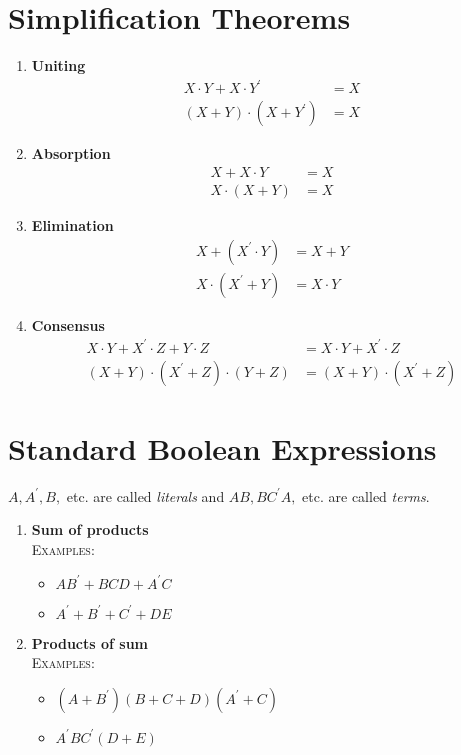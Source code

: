 \documentclass[oneside]{book}
\begin{document}
\section{Simplification Theorems}
\begin{enumerate}
	\item \textbf{Uniting}\\
	      \begin{align*}
		      X\cdot Y + X\cdot Y^\prime  & = X \\
		      (X + Y)\cdot (X + Y^\prime) & = X
	      \end{align*}
	\item \textbf{Absorption}\\
	      \begin{align*}
		      X+ X\cdot Y    & = X \\
		      X\cdot (X + Y) & = X
	      \end{align*}
	\item \textbf{Elimination}\\
	      \begin{align*}
		      X+ (X^\prime\cdot Y)  & = X + Y    \\
		      X\cdot (X^\prime + Y) & = X\cdot Y
	      \end{align*}
	\item \textbf{Consensus}\\
	      \begin{align*}
		      X\cdot Y+ X^\prime\cdot Z + Y\cdot Z     & = X\cdot Y + X^\prime \cdot Z  \\
		      (X + Y)\cdot (X^\prime + Z)\cdot (Y + Z) & =( X + Y )\cdot (X^\prime + Z)
	      \end{align*}
\end{enumerate}

\section{Standard Boolean Expressions}
$A, A^\prime, B, $ etc. are called \textit{literals} and $AB, BC^\prime A, $ etc. are called \textit{terms}.
\begin{enumerate}
	\item \textbf{Sum of products}\\
	      \textsc{Examples}:
	      \begin{itemize}
		      \item $AB^\prime + BCD + A^\prime C$
		      \item $A^\prime + B^\prime + C^\prime + DE$
	      \end{itemize}
	\item \textbf{Products of sum}\\
	      \textsc{Examples}:
	      \begin{itemize}
		      \item $(A + B^\prime)(B + C + D)(A^\prime + C)$
		      \item $A^\prime B C^\prime (D + E)$
	      \end{itemize}
\end{enumerate}



\end{document}
